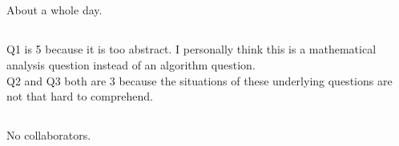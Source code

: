 \documentclass[12pt,letterpaper]{article}
\begin{document}
\subsection{}
About a whole day.
\subsection{}
Q1 is 5 because it is too abstract.
I personally think this is a mathematical analysis question instead of an algorithm question.\\
Q2 and Q3 both are 3 because the situations of these underlying questions 
are not that hard to comprehend.
\subsection{}
No collaborators.
\end{document}
